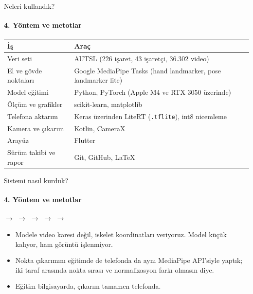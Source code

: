 \documentclass[aspectratio=169,11pt]{beamer}
\begin{document}
\begin{frame}{Neleri kullandık?}
\framesubtitle{4. Yöntem ve metotlar}
\centering
\small
\begin{tabular}{@{}ll@{}}
\toprule
\textbf{İş} & \textbf{Araç} \\
\midrule
Veri seti & AUTSL (226 işaret, 43 işaretçi, 36.302 video) \\
El ve gövde noktaları & Google MediaPipe Tasks (hand landmarker, pose landmarker lite) \\
Model eğitimi & Python, PyTorch (Apple M4 ve RTX 3050 üzerinde) \\
Ölçüm ve grafikler & scikit-learn, matplotlib \\
Telefona aktarım & Keras üzerinden LiteRT (\texttt{.tflite}), int8 nicemleme \\
Kamera ve çıkarım & Kotlin, CameraX \\
Arayüz & Flutter \\
Sürüm takibi ve rapor & Git, GitHub, \LaTeX \\
\bottomrule
\end{tabular}
\end{frame}

\begin{frame}{Sistemi nasıl kurduk?}
\framesubtitle{4. Yöntem ve metotlar}
\centering
\footnotesize
\setlength{\fboxsep}{4pt}
 $\rightarrow$
 $\rightarrow$
 $\rightarrow$
 $\rightarrow$
 $\rightarrow$

\vspace{7mm}
\normalsize
\begin{itemize}
\item Modele video karesi değil, iskelet koordinatları veriyoruz. Model küçük kalıyor, ham görüntü işlenmiyor.
\item Nokta çıkarımını eğitimde de telefonda da aynı MediaPipe API'siyle yaptık; iki taraf arasında nokta sırası ve normalizasyon farkı olmasın diye.
\item Eğitim bilgisayarda, çıkarım tamamen telefonda.
\end{itemize}
\end{frame}
\end{document}
